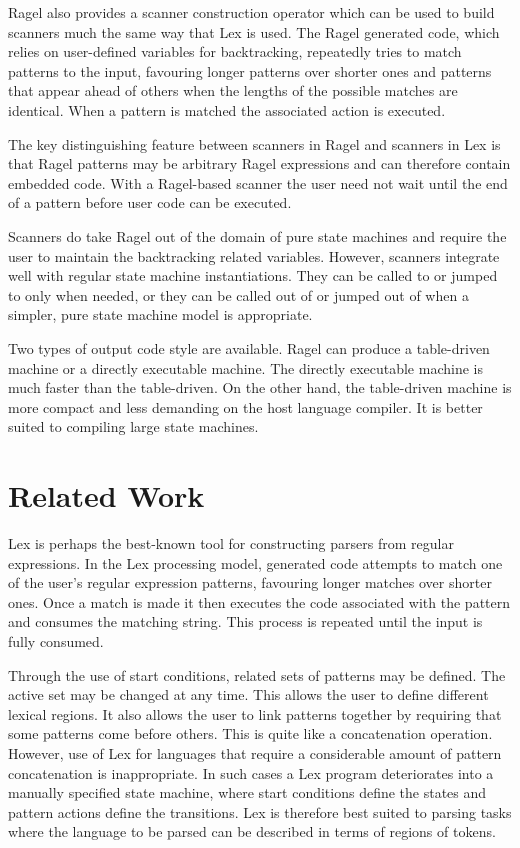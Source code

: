 \documentclass[letterpaper,11pt,oneside]{book}
\begin{document}
Ragel also provides a scanner construction operator which can be used to build scanners
much the same way that Lex is used. The Ragel generated code, which relies on
user-defined variables for
backtracking, repeatedly tries to match patterns to the input, favouring longer
patterns over shorter ones and patterns that appear ahead of others when the
lengths of the possible matches are identical. When a pattern is matched the
associated action is executed. 

The key distinguishing feature between scanners in Ragel and scanners in Lex is
that Ragel patterns may be arbitrary Ragel expressions and can therefore
contain embedded code. With a Ragel-based scanner the user need not wait until
the end of a pattern before user code can be executed.

Scanners do take Ragel out of the domain of pure state machines and require the
user to maintain the backtracking related variables.  However, scanners
integrate well with regular state machine instantiations. They can be called to
or jumped to only when needed, or they can be called out of or jumped out of
when a simpler, pure state machine model is appropriate.

Two types of output code style are available. Ragel can produce a table-driven
machine or a directly executable machine. The directly executable machine is
much faster than the table-driven. On the other hand, the table-driven machine
is more compact and less demanding on the host language compiler. It is better
suited to compiling large state machines.

\section{Related Work}

Lex is perhaps the best-known tool for constructing parsers from regular
expressions. In the Lex processing model, generated code attempts to match one
of the user's regular expression patterns, favouring longer matches over
shorter ones. Once a match is made it then executes the code associated with
the pattern and consumes the matching string.  This process is repeated until
the input is fully consumed. 

Through the use of start conditions, related sets of patterns may be defined.
The active set may be changed at any time.  This allows the user to define
different lexical regions. It also allows the user to link patterns together by
requiring that some patterns come before others.  This is quite like a
concatenation operation. However, use of Lex for languages that require a
considerable amount of pattern concatenation is inappropriate. In such cases a
Lex program deteriorates into a manually specified state machine, where start
conditions define the states and pattern actions define the transitions.  Lex
is therefore best suited to parsing tasks where the language to be parsed can
be described in terms of regions of tokens. 
\end{document}
